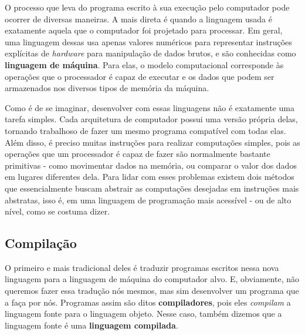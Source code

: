    O processo que leva do programa escrito à sua execução pelo computador pode
    ocorrer de diversas maneiras. A mais direta é quando a linguagem usada é
    exatamente aquela que o computador foi projetado para processar. Em geral,
    uma linguagem dessas usa apenas valores numéricos para representar
    instruções explícitas de \emph{hardware} para manipulação de dados brutos,
    e são conhecidas como \textbf{linguagem de máquina}.
    Para elas, o modelo computacional corresponde às operações que o processador
    é capaz de executar e os dados que podem ser armazenados nos diversos tipos
    de memória da máquina.

    
    Como é de se imaginar, desenvolver com essas linguagens não é exatamente uma
    tarefa simples. Cada arquitetura de computador possui uma versão própria
    delas, tornando trabalhoso de fazer um mesmo programa compatível com todas
    elas. Além disso, é preciso muitas instruções para realizar computações
    simples, pois as operações que um processador é capaz de fazer são
    normalmente bastante primitivas - como movimentar dados na memória, ou
    comparar o valor dos dados em lugares diferentes dela. Para lidar com esses
    problemas existem dois métodos que essencialmente buscam abstrair as
    computações desejadas em instruções mais abstratas, isso é, em uma linguagem
    de programação mais acessível - ou de alto nível, como se costuma dizer.

    \subsection{Compilação}
    \label{cap:conceitos:maquina:compilacao}

    O primeiro e mais tradicional deles é traduzir programas escritos nessa
    nova linguagem para a linguagem de máquina do computador alvo. E,
    obviamente, não queremos fazer essa tradução nós mesmos, mas sim desenvolver
    um programa que a faça por nós. Programas assim são ditos
    \textbf{compiladores}, pois eles \emph{compilam} a linguagem fonte para o
    linguagem objeto. Nesse caso, também dizemos que a linguagem fonte é uma
    \textbf{linguagem compilada}.
    
    
